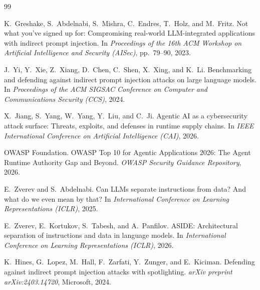 \begin{thebibliography}{99}


K.~Greshake, S.~Abdelnabi, S.~Mishra, C.~Endres, T.~Holz, and M.~Fritz.
\newblock Not what you've signed up for: Compromising real-world LLM-integrated applications with indirect prompt injection.
\newblock In \emph{Proceedings of the 16th ACM Workshop on Artificial Intelligence and Security (AISec)}, pp.~79--90, 2023.

J.~Yi, Y.~Xie, Z.~Xiang, D.~Chen, C.~Shen, X.~Xing, and K.~Li.
\newblock Benchmarking and defending against indirect prompt injection attacks on large language models.
\newblock In \emph{Proceedings of the ACM SIGSAC Conference on Computer and Communications Security (CCS)}, 2024.

X.~Jiang, S.~Yang, W.~Yang, Y.~Liu, and C.~Ji.
\newblock Agentic AI as a cybersecurity attack surface: Threats, exploits, and defenses in runtime supply chains.
\newblock In \emph{IEEE International Conference on Artificial Intelligence (CAI)}, 2026.

OWASP Foundation.
\newblock OWASP Top 10 for Agentic Applications 2026: The Agent Runtime Authority Gap and Beyond.
\newblock \emph{OWASP Security Guidance Repository}, 2026.


E.~Zverev and S.~Abdelnabi.
\newblock Can LLMs separate instructions from data? And what do we even mean by that?
\newblock In \emph{International Conference on Learning Representations (ICLR)}, 2025.

E.~Zverev, E.~Kortukov, S.~Tabesh, and A.~Panfilov.
\newblock ASIDE: Architectural separation of instructions and data in language models.
\newblock In \emph{International Conference on Learning Representations (ICLR)}, 2026.

K.~Hines, G.~Lopez, M.~Hall, F.~Zarfati, Y.~Zunger, and E.~Kiciman.
\newblock Defending against indirect prompt injection attacks with spotlighting.
\newblock \emph{arXiv preprint arXiv:2403.14720}, Microsoft, 2024.


\end{thebibliography}
